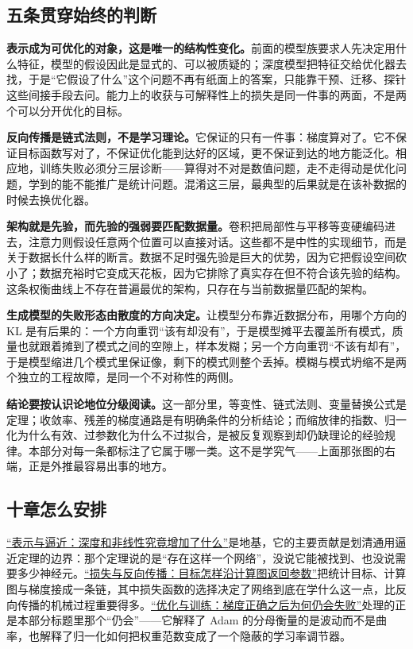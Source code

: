 \subsection{五条贯穿始终的判断}

\textbf{表示成为可优化的对象，这是唯一的结构性变化。}前面的模型族要求人先决定用什么特征，模型的假设因此是显式的、可以被质疑的；深度模型把特征交给优化器去找，于是``它假设了什么''这个问题不再有纸面上的答案，只能靠干预、迁移、探针这些间接手段去问。能力上的收获与可解释性上的损失是同一件事的两面，不是两个可以分开优化的目标。

\textbf{反向传播是链式法则，不是学习理论。}它保证的只有一件事：梯度算对了。它不保证目标函数写对了，不保证优化能到达好的区域，更不保证到达的地方能泛化。相应地，训练失败必须分三层诊断——算得对不对是数值问题，走不走得动是优化问题，学到的能不能推广是统计问题。混淆这三层，最典型的后果就是在该补数据的时候去换优化器。

\textbf{架构就是先验，而先验的强弱要匹配数据量。}卷积把局部性与平移等变硬编码进去，注意力则假设任意两个位置可以直接对话。这些都不是中性的实现细节，而是关于数据长什么样的断言。数据不足时强先验是巨大的优势，因为它把假设空间砍小了；数据充裕时它变成天花板，因为它排除了真实存在但不符合该先验的结构。这条权衡曲线上不存在普遍最优的架构，只存在与当前数据量匹配的架构。

\textbf{生成模型的失败形态由散度的方向决定。}让模型分布靠近数据分布，用哪个方向的 KL 是有后果的：一个方向重罚``该有却没有''，于是模型摊平去覆盖所有模式，质量也就跟着摊到了模式之间的空隙上，样本发糊；另一个方向重罚``不该有却有''，于是模型缩进几个模式里保证像，剩下的模式则整个丢掉。模糊与模式坍缩不是两个独立的工程故障，是同一个不对称性的两侧。

\textbf{结论要按认识论地位分级阅读。}这一部分里，等变性、链式法则、变量替换公式是定理；收敛率、残差的梯度通路是有明确条件的分析结论；而缩放律的指数、归一化为什么有效、过参数化为什么不过拟合，是被反复观察到却仍缺理论的经验规律。本部分对每一条都标注了它属于哪一类。这不是学究气——上面那张图的右端，正是外推最容易出事的地方。

\subsection{十章怎么安排}

\hyperref[ch:123]{``表示与逼近：深度和非线性究竟增加了什么''}是地基，它的主要贡献是划清通用逼近定理的边界：那个定理说的是``存在这样一个网络''，没说它能被找到、也没说需要多少神经元。\hyperref[ch:124]{``损失与反向传播：目标怎样沿计算图返回参数''}把统计目标、计算图与梯度接成一条链，其中损失函数的选择决定了网络到底在学什么这一点，比反向传播的机械过程重要得多。\hyperref[ch:125]{``优化与训练：梯度正确之后为何仍会失败''}处理的正是本部分标题里那个``仍会''——它解释了 Adam 的分母衡量的是波动而不是曲率，也解释了归一化如何把权重范数变成了一个隐蔽的学习率调节器。

